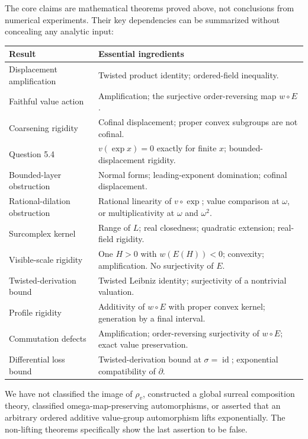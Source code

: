 \documentclass[11pt]{article}
\theoremstyle{definition}
\theoremstyle{remark}
\newcommand{\id}{\operatorname{id}}
\numberwithin{equation}{section}
\begin{document}
The core claims are mathematical theorems proved above, not conclusions
from numerical experiments. Their key dependencies can be summarized
without concealing any analytic input:
\begin{center}
\small
\begin{tabular}{@{}p{}p{}@{}}
\toprule
Result & Essential ingredients\\
\midrule
Displacement amplification & Twisted product identity; ordered-field inequality.\\
Faithful value action & Amplification; the surjective order-reversing map $w\circ E$.\\
Coarsening rigidity & Cofinal displacement; proper convex subgroups are not cofinal.\\
Question 5.4 & $v(\exp x)=0$ exactly for finite $x$; bounded-displacement rigidity.\\
Bounded-layer obstruction & Normal forms; leading-exponent domination; cofinal displacement.\\
Rational-dilation obstruction & Rational linearity of $v\circ\exp$; value comparison at $\omega$, or multiplicativity at $\omega$ and $\omega^2$.\\
Surcomplex kernel & Range of $L$; real closedness; quadratic extension; real-field rigidity.\\
Visible-scale rigidity & One $H>0$ with $w(E(H))<0$; convexity; amplification. No surjectivity of $E$.\\
Twisted-derivation bound & Twisted Leibniz identity; surjectivity of a nontrivial valuation.\\
Profile rigidity & Additivity of $w\circ E$ with proper convex kernel; generation by a final interval.\\
Commutation defects & Amplification; order-reversing surjectivity of $w\circ E$; exact value preservation.\\
Differential loss bound & Twisted-derivation bound at $\sigma=\id$; exponential compatibility of $\partial$.\\
\bottomrule
\end{tabular}
\end{center}

We have not classified the image of $\rho_v$, constructed a global
surreal composition theory, classified omega-map-preserving
automorphisms, or asserted that an arbitrary ordered additive value-group
automorphism lifts exponentially. The non-lifting theorems specifically
show the last assertion to be false.
\end{document}

